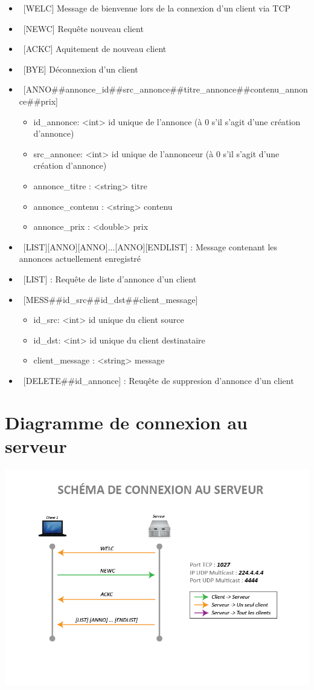 \documentclass[12pt]{article}
\begin{document}
\begin{itemize}
  \item~[WELC] Message de bienvenue lors de la connexion d'un client via TCP
  \item~[NEWC] Requête nouveau client
  \item~[ACKC] Aquitement de nouveau client
  \item~[BYE]  Déconnexion d'un client
  \item~[ANNO\#\#annonce\_id\#\#src\_annonce\#\#titre\_annonce\#\#contenu\_annonce\#\#prix]
  \begin{itemize}
    \item id\_annonce: <int>  id unique de l'annonce (à 0 s'il s'agit d'une création d'annonce)
    \item src\_annonce: <int> id unique de l'annonceur (à 0 s'il s'agit d'une création d'annonce)
    \item annonce\_titre : <string> titre
    \item annonce\_contenu : <string> contenu
    \item annonce\_prix : <double> prix
  \end{itemize}
  \item~[LIST][ANNO][ANNO]...[ANNO][ENDLIST] : Message contenant les annonces actuellement enregistré
  \item~[LIST] : Requête de liste d'annonce d'un client
  \item~[MESS\#\#id\_src\#\#id\_dst\#\#client\_message]
  \begin{itemize}
    \item id\_src: <int> id unique du client source 
    \item id\_dst: <int> id unique du client destinataire
    \item client\_message : <string> message
  \end{itemize}
  \item~[DELETE\#\#id\_annonce] : Reuqête de suppresion d'annonce d'un client
\end{itemize}


\section{Diagramme de connexion au serveur}

\includegraphics[width=\textwidth]{rendu1/Protocole_Connection.png}
\end{document}
